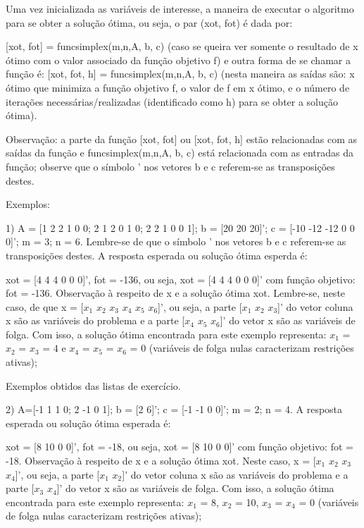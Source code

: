 \documentclass[10pt]{article}
\begin{document}
Uma vez inicializada as variáveis de interesse, a maneira de executar o algoritmo para se obter a solução ótima, ou seja, o par (xot, fot) é dada por:
\newline

[xot, fot] = funcsimplex(m,n,A, b, c) (caso se queira ver somente o resultado de x ótimo com o valor associado da função objetivo f) e outra forma de se chamar a função é: [xot, fot, h] = funcsimplex(m,n,A, b, c) (nesta maneira as saídas são: x ótimo que minimiza a função objetivo f, o valor de f em x ótimo, e o número de iterações necessárias/realizadas (identificado como h) para se obter a solução ótima).
\newline

Observação: a parte da função [xot, fot] ou [xot, fot, h] estão relacionadas com as saídas da função e funcsimplex(m,n,A, b, c) está relacionada com as entradas da função; observe que o símbolo ' nos vetores b e c referem-se as transposições destes.

Exemplos:
\newline

1)
A = [1 2 2 1 0 0; 2 1 2 0 1 0; 2 2 1 0 0 1]; b = [20 20 20]'; c = [-10 -12 -12 0 0 0]'; m = 3; n = 6. Lembre-se de que o símbolo ' nos vetores b e c referem-se as transposições destes. A resposta esperada ou solução ótima esperda é:
\newline

xot = [4 4 4 0 0 0]', fot = -136, ou seja, xot = [4 4 4 0 0 0]' com função objetivo: fot = -136.
\newline
Observação à respeito de x e a solução ótima xot. Lembre-se, neste caso, de que x = [$x_1$ $x_2$ $x_3$ $x_4$ $x_5$ $x_6$]', ou seja, a parte [$x_1$ $x_2$ $x_3$]' do vetor coluna x são as variáveis do problema e a parte [$x_4$ $x_5$ $x_6$]' do vetor x são as variáveis de folga. Com isso, a solução ótima encontrada para este exemplo representa: $x_1$ = $x_2$ = $x_3$ = $4$ e $x_4$ = $x_5$ = $x_6$ = $0$ (variáveis de folga nulas caracterizam restrições ativas);
\newline

Exemplos obtidos das listas de exercício.
\newline

2) A=[-1 1 1 0; 2 -1 0 1]; b = [2 6]'; c = [-1 -1 0 0]'; m = 2; n = 4. A resposta esperada ou solução ótima esperada é:
\newline

xot = [8 10 0 0]', fot = -18, ou seja, xot = [8 10 0 0]' com função objetivo: fot = -18.
\newline
Observação à respeito de x e a solução ótima xot. Neste caso, x = [$x_1$ $x_2$ $x_3$ $x_4$]', ou seja, a parte [$x_1$ $x_2$]' do vetor coluna x são as variáveis do problema e a parte [$x_3$ $x_4$]' do vetor x são as variáveis de folga. Com isso, a solução ótima encontrada para este exemplo representa: $x_1$ = 8, $x_2$ = 10, $x_3$ = $x_4$ = 0 (variáveis de folga nulas caracterizam restrições ativas);
\newline
\end{document}
